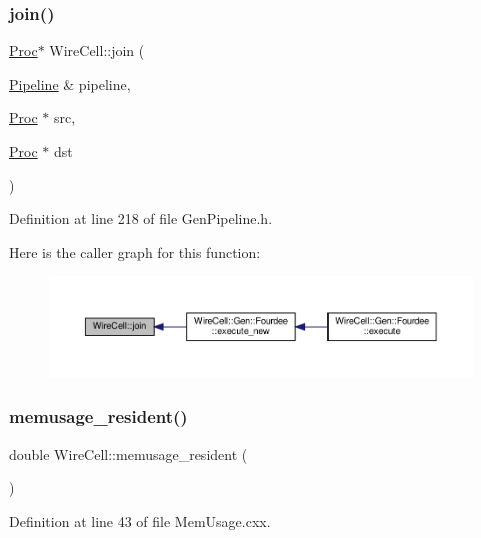 \subsubsection{\texorpdfstring{join()}{join()}}
{\footnotesize\ttfamily \hyperlink{class_wire_cell_1_1_proc}{Proc}$\ast$ Wire\+Cell\+::join (\begin{DoxyParamCaption}\item[{\hyperlink{namespace_wire_cell_a7f9ab409f961e35f837782a615c0020f}{Pipeline} \&}]{pipeline,  }\item[{\hyperlink{class_wire_cell_1_1_proc}{Proc} $\ast$}]{src,  }\item[{\hyperlink{class_wire_cell_1_1_proc}{Proc} $\ast$}]{dst }\end{DoxyParamCaption})}



Definition at line 218 of file Gen\+Pipeline.\+h.

Here is the caller graph for this function\+:
\nopagebreak
\begin{figure}[H]
\begin{center}
\leavevmode
\includegraphics[width=350pt]{namespace_wire_cell_ae2a1084afa4709a44b48a25097f5e231_icgraph}
\end{center}
\end{figure}
\mbox{\label{namespace_wire_cell_ab9a89ef526d9db272e072e95556f6a3b}} 
\subsubsection{\texorpdfstring{memusage\+\_\+resident()}{memusage\_resident()}}
{\footnotesize\ttfamily double Wire\+Cell\+::memusage\+\_\+resident (\begin{DoxyParamCaption}{ }\end{DoxyParamCaption})}



Definition at line 43 of file Mem\+Usage.\+cxx.

